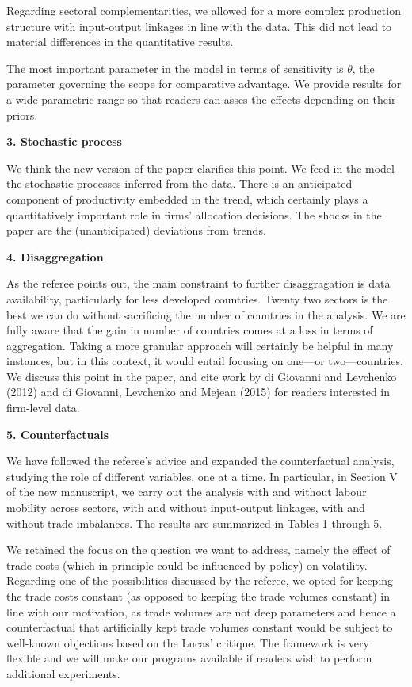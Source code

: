 \documentclass[12pt]{article}
\begin{document}
Regarding sectoral complementarities, we allowed for a more complex
production structure with input-output linkages in line with the data. This
did not lead to material differences in the quantitative results. 

The most important parameter in the model in terms of sensitivity is $\theta 
$, the parameter governing the scope for comparative advantage. We provide
results for a wide parametric range so that readers can asses the effects
depending on their priors.\bigskip 

\textbf{3. Stochastic process}

We think the new version of the paper clarifies this point. We feed in the
model the stochastic processes inferred from the data. There is an
anticipated component of productivity embedded in the trend, which certainly
plays a quantitatively important role in firms' allocation decisions. The
shocks in the paper are the (unanticipated) deviations from trends.\bigskip 

\textbf{4. Disaggregation}

As the referee points out, the main constraint to further disaggragation is
data availability, particularly for less developed countries. Twenty two
sectors is the best we can do without sacrificing the number of countries in
the analysis. We are fully aware that the gain in number of countries comes
at a loss in terms of aggregation. Taking a more granular approach will
certainly be helpful in many instances, but in this context, it would entail
focusing on one---or two---countries. We discuss this point in the paper,
and cite work by di Giovanni and Levchenko (2012) and di Giovanni, Levchenko
and Mejean (2015) for readers interested in firm-level data.\bigskip 

\textbf{5. Counterfactuals}

We have followed the referee's advice and expanded the counterfactual
analysis, studying the role of different variables, one at a time. In
particular, in Section V of the new manuscript, we carry out the analysis
with and without labour mobility across sectors, with and without
input-output linkages, with and without trade imbalances. The results are
summarized in Tables 1 through 5.

We retained the focus on the question we want to address, namely the effect
of trade costs (which in principle could be influenced by policy) on
volatility. Regarding one of the possibilities discussed by the referee, we
opted for keeping the trade costs constant (as opposed to keeping the trade
volumes constant) in line with our motivation, as trade volumes are not deep
parameters and hence a counterfactual that artificially kept trade volumes
constant would be subject to well-known objections based on the Lucas'
critique. The framework is very flexible and we will make our programs
available if readers wish to perform additional experiments.\bigskip 
\end{document}
